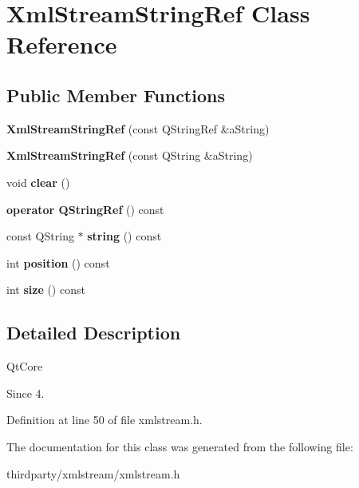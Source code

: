 \hypertarget{class_xml_stream_string_ref}{}\section{Xml\+Stream\+String\+Ref Class Reference}
\label{class_xml_stream_string_ref}
\subsection*{Public Member Functions}
\begin{DoxyCompactItemize}
\item 
\mbox{\label{class_xml_stream_string_ref_ab194207c2ae446316d979c43d05b1ded}} 
{\bfseries Xml\+Stream\+String\+Ref} (const Q\+String\+Ref \&a\+String)
\item 
\mbox{\label{class_xml_stream_string_ref_a477cdb60a33ec7864b6db2928bfd9b25}} 
{\bfseries Xml\+Stream\+String\+Ref} (const Q\+String \&a\+String)
\item 
\mbox{\label{class_xml_stream_string_ref_a4f50790aca245c068446b5aaee6b9c67}} 
void {\bfseries clear} ()
\item 
\mbox{\label{class_xml_stream_string_ref_ab6ff1a8788f6736b4af02663b18fa143}} 
{\bfseries operator Q\+String\+Ref} () const
\item 
\mbox{\label{class_xml_stream_string_ref_a3619319426e66c5763bf62e3bc21af9b}} 
const Q\+String $\ast$ {\bfseries string} () const
\item 
\mbox{\label{class_xml_stream_string_ref_a52f1c45c3ca240f7cf91ebf470843f2e}} 
int {\bfseries position} () const
\item 
\mbox{\label{class_xml_stream_string_ref_afa3a0f2548f82904efdc8eaad1a926a2}} 
int {\bfseries size} () const
\end{DoxyCompactItemize}


\subsection{Detailed Description}
Qt\+Core \begin{DoxySince}{Since}
4. 
\end{DoxySince}


Definition at line 50 of file xmlstream.\+h.



The documentation for this class was generated from the following file\+:\begin{DoxyCompactItemize}
\item 
thirdparty/xmlstream/xmlstream.\+h\end{DoxyCompactItemize}
